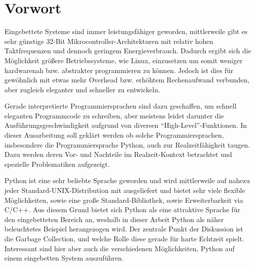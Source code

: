 \section{Vorwort}

Eingebettete Systeme sind immer leistungsfähiger geworden, mittlerweile gibt
es sehr günstige 32-Bit Mikrocontroller-Architekturen mit relativ hohen
Taktfrequenzen und dennoch geringem Energieverbrauch. Dadurch ergibt sich die
Möglichkeit größere Betriebssysteme, wie Linux, einzusetzen um somit weniger
hardwarenah bzw. abstrakter programmieren zu können. Jedoch ist dies für
gewöhnlich mit etwas mehr Overhead bzw. erhöhtem Rechenaufwand verbunden,
aber zugleich eleganter und schneller zu entwickeln.
\cite{abbr}

Gerade interpretierte Programmiersprachen sind dazu geschaffen, um schnell
eleganten Programmcode zu schreiben, aber meistens leidet darunter die
Aus\-führ\-ungs\-gesch\-windig\-keit aufgrund von diversen “High-Level”-Funktionen. In
dieser Ausarbeitung soll geklärt werden ob solche Programmiersprachen,
insbesondere die Programmiersprache Python, auch zur Realzeitfähigkeit taugen.
Dazu werden deren Vor- und Nachteile im Realzeit-Kontext betrachtet und
spezielle Problematiken aufgezeigt.


Python ist eine sehr beliebte Sprache geworden und wird mittlerweile auf
nahezu jeder Standard-UNIX-Distribution mit ausgeliefert und bietet sehr
viele flexible Möglichkeiten, sowie eine große Standard-Bibliothek, sowie
Erweiterbarkeit via C/C++. Aus diesem Grund bietet sich Python als eine
attraktive Sprache für den eingebetteten Bereich an, weshalb in dieser Arbeit
Python als näher beleuchtetes Beispiel herangezogen wird. Der zentrale Punkt
der Diskussion ist die Garbage Collection, und welche Rolle diese gerade für
harte Echtzeit spielt.
Interessant sind hier aber auch die verschiedenen Möglichkeiten, Python auf
einem eingebetten System auszuführen.
